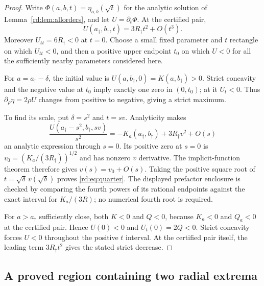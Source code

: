 \begin{proof}
Write $\Phi(a,b,t)=\eta_{a,b}(\sqrt t)$ for the analytic solution
of Lemma~\ref{rd:lem:allorders}, and let $U=\partial_t\Phi$.
At the certified pair,
\[
 U(a_\dagger,b_\dagger,t)=3R_\dagger t^2+O(t^3).
\]
Moreover $U_{tt}=6R_\dagger<0$ at $t=0$. Choose a small fixed
parameter and $t$ rectangle on which $U_{tt}<0$, and then a positive
upper endpoint $t_0$ on which $U<0$ for all the sufficiently nearby
parameters considered here.

For $a=a_\dagger-\delta$, the initial value is
$U(a,b_\dagger,0)=K(a,b_\dagger)>0$. Strict concavity and the
negative value at $t_0$ imply exactly one zero in $(0,t_0)$; at it
$U_t<0$. Thus $\partial_\rho\eta=2\rho U$ changes from positive
to negative, giving a strict maximum.

To find its scale, put $\delta=s^2$ and $t=sv$. Analyticity makes
\[
 \frac{U(a_\dagger-s^2,b_\dagger,sv)}{s^2}
   =-K_a(a_\dagger,b_\dagger)+3R_\dagger v^2+O(s)
\]
an analytic expression through $s=0$. Its positive zero at $s=0$ is
$v_0=(K_a/(3R_\dagger))^{1/2}$ and has nonzero $v$ derivative.
The implicit-function theorem therefore gives
$v(s)=v_0+O(s)$. Taking the positive square root of
$t=\sqrt\delta\,v(\sqrt\delta)$ proves \eqref{rd:eq:quarter}.
The displayed prefactor enclosure is checked by comparing the fourth
powers of its rational endpoints against the exact interval for
$K_a/(3R)$; no numerical fourth root is required.

For $a>a_\dagger$ sufficiently close, both $K<0$ and $Q<0$,
because $K_a<0$ and $Q_a<0$ at the certified pair. Hence $U(0)<0$
and $U_t(0)=2Q<0$. Strict concavity forces $U<0$ throughout the
positive $t$ interval. At the certified pair itself, the leading term
$3R_\dagger t^2$ gives the stated strict decrease.
\end{proof}

\subsection{A proved region containing two radial extrema}

